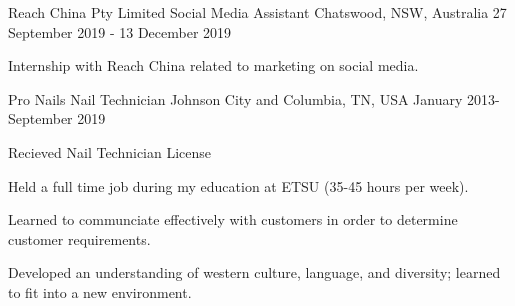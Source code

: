 

\begin{cventries}

  \cventry
    {Reach China Pty Limited} %
    {Social Media Assistant} %
    {Chatswood, NSW, Australia} %
    {27 September 2019 - 13 December 2019} %
    {
      \begin{cvitems} %
      \item Internship with Reach China related to marketing on social media.
      \end{cvitems}
    }

  \cventry
    {Pro Nails} %
    {Nail Technician} %
    {Johnson City and Columbia, TN, USA} %
    {January 2013-September 2019} %
    {
      \begin{cvitems} %
      \item Recieved Nail Technician License
      \item Held a full time job during my education at ETSU (35-45 hours per week).
      \item Learned to communciate effectively with customers in order to determine customer requirements.
      \item Developed an understanding of western culture, language, and diversity; learned to fit into a new environment.
      \end{cvitems}
    }
\end{cventries}
